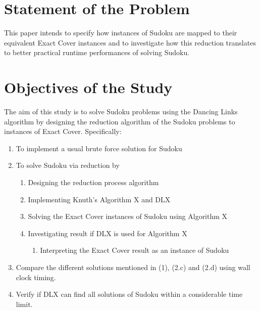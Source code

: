 \documentclass[a4paper,oneside,11pt]{report}
\begin{document}
\begin{figure}[h]
  \centering
  \caption{}
\end{figure}
\newpage

\section{Statement of the Problem}
This paper intends to specify how instances of Sudoku are mapped to their equivalent Exact Cover instances and to investigate how this reduction translates to better practical runtime performances of solving Sudoku.

\section{Objectives of the Study}
The aim of this study is to solve Sudoku problems using the Dancing Links algorithm by designing the reduction algorithm of the Sudoku problems to instances of Exact Cover. Specifically:
\begin{enumerate}
\item To implement a usual brute force solution for Sudoku
\item To solve Sudoku via reduction by
\begin{enumerate}
\item Designing the reduction process algorithm
\item Implementing Knuth$’$s Algorithm X and DLX
\item Solving the Exact Cover instances of Sudoku using Algorithm X
\item Investigating result if DLX is used for Algorithm X
\begin{enumerate}
\item Interpreting the Exact Cover result as an instance of Sudoku
\end{enumerate}
\end{enumerate}
\item Compare the different solutions mentioned in (1), (2.c) and (2.d) using wall clock timing.
\item Verify if DLX can find all solutions of Sudoku within a considerable time limit.
\end{enumerate}
\end{document}
